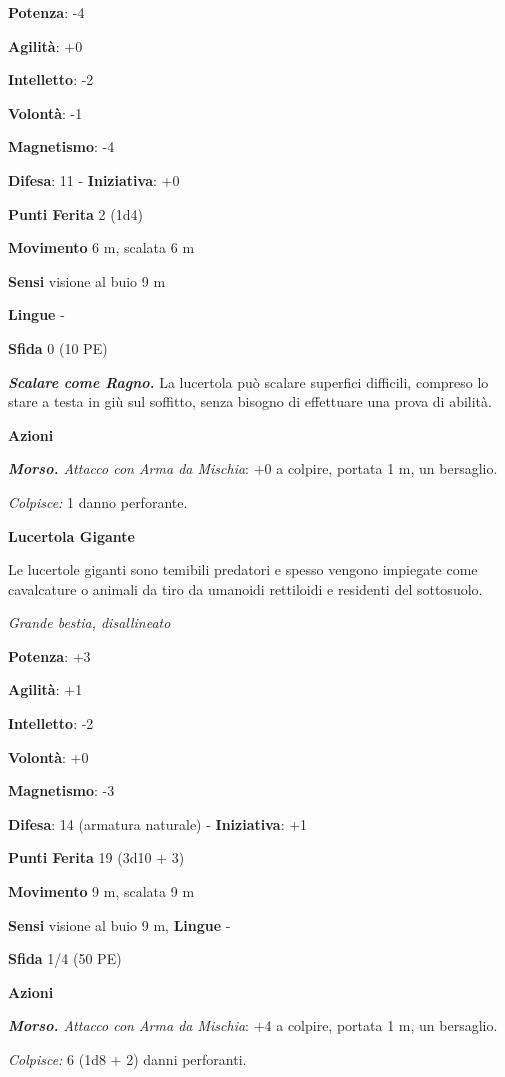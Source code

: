 \begin{multicols}{2}
\textbf{Potenza}: -4

\textbf{Agilità}: +0

\textbf{Intelletto}: -2

\textbf{Volontà}: -1

\textbf{Magnetismo}: -4

\textbf{Difesa}: 11 - \textbf{Iniziativa}: +0

\textbf{Punti Ferita} 2 (1d4)

\textbf{Movimento} 6 m, scalata 6 m

\textbf{Sensi} visione al buio 9 m

\textbf{Lingue} -

\textbf{Sfida} 0 (10 PE)\smallskip

\emph{\textbf{Scalare come Ragno.}} La lucertola può scalare superfici
difficili, compreso lo stare a testa in giù sul soffitto, senza bisogno
di effettuare una prova di abilità.

\smallskip\textbf{Azioni}

\emph{\textbf{Morso.} Attacco con Arma da Mischia}: +0 a colpire,
portata 1 m, un bersaglio.

\emph{Colpisce:} 1 danno perforante.

\textbf{Lucertola Gigante}

Le lucertole giganti sono temibili predatori e spesso vengono impiegate
come cavalcature o animali da tiro da umanoidi rettiloidi e residenti
del sottosuolo.

\emph{Grande bestia, disallineato}

\textbf{Potenza}: +3

\textbf{Agilità}: +1

\textbf{Intelletto}: -2

\textbf{Volontà}: +0

\textbf{Magnetismo}: -3

\textbf{Difesa}: 14 (armatura naturale) - \textbf{Iniziativa}: +1

\textbf{Punti Ferita} 19 (3d10 + 3)

\textbf{Movimento} 9 m, scalata 9 m

\textbf{Sensi} visione al buio 9 m, 
\textbf{Lingue} -

\textbf{Sfida} 1/4 (50 PE)\smallskip

\smallskip\textbf{Azioni}

\emph{\textbf{Morso.} Attacco con Arma da Mischia}: +4 a colpire,
portata 1 m, un bersaglio.

\emph{Colpisce:} 6 (1d8 + 2) danni perforanti.


\end{multicols}
